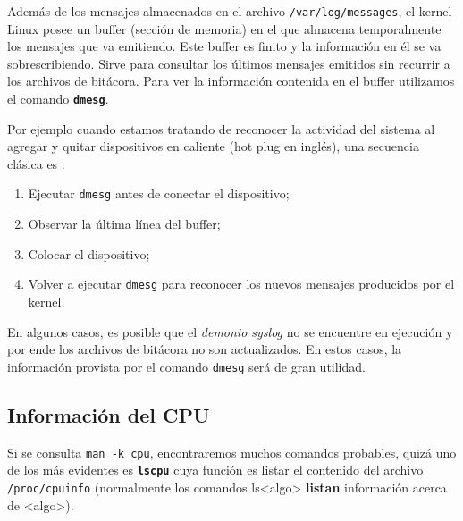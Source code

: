 \documentclass[12pt]{article}
\begin{document}

Además de los mensajes almacenados en el archivo \texttt{/var/log/messages}, el kernel Linux posee un buffer 
(sección de memoria) en el que almacena temporalmente los mensajes que va emitiendo. Este buffer es 
finito y la información en él se va sobrescribiendo. Sirve para 
consultar los últimos mensajes emitidos sin recurrir a los archivos de bitácora. Para ver la información contenida en el 
buffer utilizamos el comando \texttt{\textbf{dmesg}}. 

Por ejemplo cuando estamos tratando de reconocer la actividad del sistema al agregar y quitar 
dispositivos en caliente (hot plug en inglés), una secuencia clásica es :

\begin{enumerate}
	\item Ejecutar \texttt{dmesg} antes de conectar el dispositivo;
	\item Observar la última línea del buffer;
	\item Colocar el dispositivo;
	\item Volver a ejecutar \texttt{dmesg} para reconocer los nuevos mensajes producidos por el kernel.
\end{enumerate}

En algunos casos, es posible que el {\it demonio syslog} no se encuentre en ejecución y por ende los archivos
de bitácora no son actualizados. En estos casos, la información provista por el comando {\tt dmesg} será de 
gran utilidad. 


\subsection*{Información del CPU}

Si se consulta \texttt{man -k cpu}, encontraremos muchos comandos probables, quizá 
uno de los más evidentes es \textbf{\texttt{lscpu}} cuya función es listar el contenido del archivo 
\texttt{/proc/cpuinfo} (normalmente los comandos ls{\textless}algo\textgreater  
 \textbf{listan} información acerca de {\textless}algo\textgreater).
\end{document}
